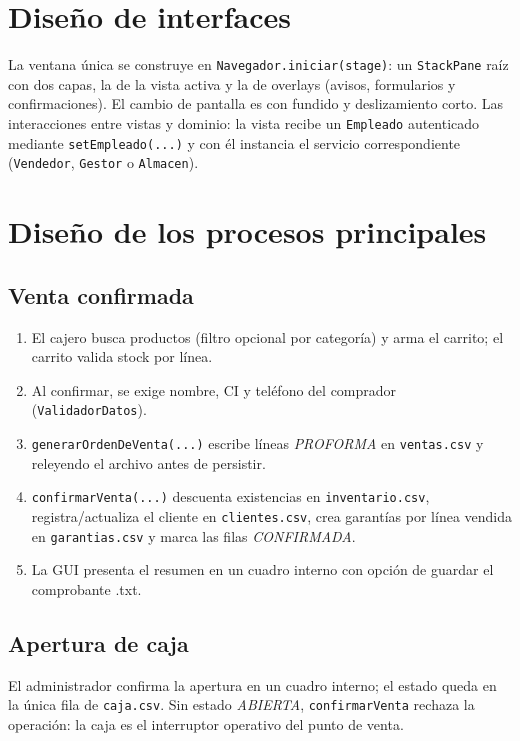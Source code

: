 \section{Diseño de interfaces}
La ventana única se construye en \texttt{Navegador.iniciar(stage)}: un \texttt{StackPane} raíz con dos capas, la de la vista activa y la de overlays (avisos, formularios y confirmaciones). El cambio de pantalla es con fundido y deslizamiento corto. Las interacciones entre vistas y dominio: la vista recibe un \texttt{Empleado} autenticado mediante \texttt{setEmpleado(...)} y con él instancia el servicio correspondiente (\texttt{Vendedor}, \texttt{Gestor} o \texttt{Almacen}).

\section{Diseño de los procesos principales}
\subsection{Venta confirmada}
\begin{enumerate}
\item El cajero busca productos (filtro opcional por categoría) y arma el carrito; el carrito valida stock por línea.
\item Al confirmar, se exige nombre, CI y teléfono del comprador (\texttt{ValidadorDatos}).
\item \texttt{generarOrdenDeVenta(...)} escribe líneas \emph{PROFORMA} en \texttt{ventas.csv} y releyendo el archivo antes de persistir.
\item \texttt{confirmarVenta(...)} descuenta existencias en \texttt{inventario.csv}, registra/actualiza el cliente en \texttt{clientes.csv}, crea garantías por línea vendida en \texttt{garantias.csv} y marca las filas \emph{CONFIRMADA}.
\item La GUI presenta el resumen en un cuadro interno con opción de guardar el comprobante .txt.
\end{enumerate}

\subsection{Apertura de caja}
El administrador confirma la apertura en un cuadro interno; el estado queda en la única fila de \texttt{caja.csv}. Sin estado \emph{ABIERTA}, \texttt{confirmarVenta} rechaza la operación: la caja es el interruptor operativo del punto de venta.

